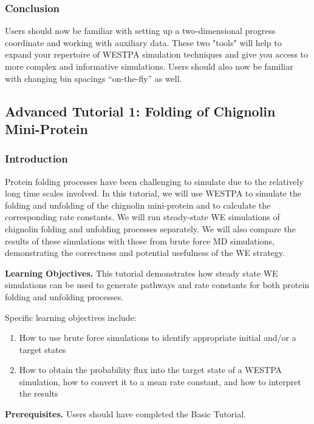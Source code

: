 \documentclass[9pt,tutorial,pubversion]{livecoms}
\begin{document}
\subsubsection{Conclusion}

Users should now be familiar with setting up a two-dimensional progress coordinate and working with auxiliary data. 
These two "tools" will help to expand your repertoire of WESTPA simulation techniques and give you access to more complex and informative simulations. 
Users should also now be familiar with changing bin spacings “on-the-fly” as well. 

\subsection{Advanced Tutorial 1: Folding of Chignolin Mini-Protein}

\subsubsection{Introduction}

Protein folding processes have been challenging to simulate due to the relatively long time scales involved. 
In this tutorial, we will use WESTPA to simulate the folding and unfolding of the chignolin mini-protein and to calculate the corresponding rate constants. 
We will run steady-state WE simulations of chignolin folding and unfolding processes separately. 
We will also compare the results of these simulations with those from brute force MD simulations, demonstrating the correctness and potential usefulness of the WE strategy. 
 
\textbf{Learning Objectives.} This tutorial demonstrates how steady state WE simulations can be used to generate pathways and rate constants for both protein folding and unfolding processes.  

Specific learning objectives include:
\begin{enumerate}
\item How to use brute force simulations to identify appropriate initial and/or a target states
\item How to obtain the probability flux into the target state of a WESTPA simulation, how to convert it to a mean rate constant, and how to interpret the results
\end{enumerate}

\textbf{Prerequisites.} Users should have completed the Basic Tutorial.
 
\end{document}
